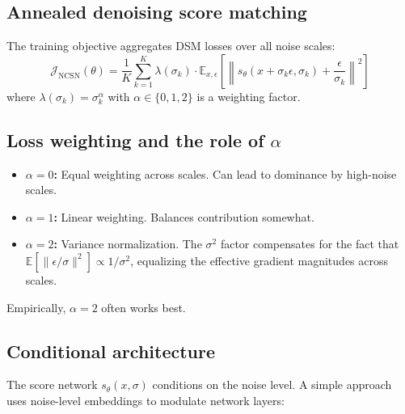 \documentclass[11pt]{article}
\theoremstyle{definition}
\begin{document}
\subsection{Annealed denoising score matching}
The training objective aggregates DSM losses over all noise scales:
\begin{equation}
\label{eq:ncsn}
\boxed{
\mathcal{J}_{\text{NCSN}}(\theta)
= \frac{1}{K}\sum_{k=1}^K \lambda(\sigma_k) \cdot
\mathbb{E}_{x,\epsilon}\left[\left\| s_\theta(x+\sigma_k \epsilon, \sigma_k) + \frac{\epsilon}{\sigma_k}\right\|^2\right]
}
\end{equation}
where $\lambda(\sigma_k) = \sigma_k^\alpha$ with $\alpha \in \{0, 1, 2\}$ is a weighting factor.

\subsection{Loss weighting and the role of $\alpha$}
\begin{itemize}
\item \textbf{$\alpha = 0$:} Equal weighting across scales. Can lead to dominance by high-noise scales.
\item \textbf{$\alpha = 1$:} Linear weighting. Balances contribution somewhat.
\item \textbf{$\alpha = 2$:} Variance normalization. The $\sigma^2$ factor compensates for the fact that 
$\mathbb{E}[\|\epsilon/\sigma\|^2] \propto 1/\sigma^2$, equalizing the effective gradient magnitudes across scales.
\end{itemize}
Empirically, $\alpha = 2$ often works best.

\subsection{Conditional architecture}
The score network $s_\theta(x, \sigma)$ conditions on the noise level. 
A simple approach uses noise-level embeddings to modulate network layers:
\end{document}
